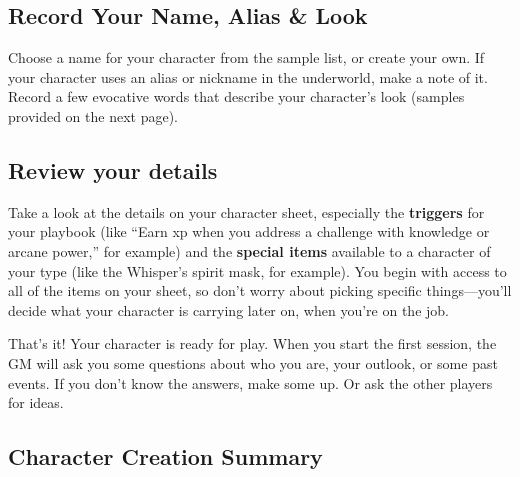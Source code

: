 \subsection{Record Your Name, Alias \& Look}

Choose a name for your character from the sample list, or create your own. If your character uses an alias or nickname in the underworld, make a note of it. Record a few evocative words that describe your character’s look (samples provided on the next page).

\subsection{Review your details}

Take a look at the details on your character sheet, especially the  \textbf{triggers} for your playbook (like ``Earn xp when you address a challenge with knowledge or arcane power,'' for example) and the \textbf{special items} available to a character of your type (like the Whisper’s spirit mask, for example). You begin with access to all of the items on your sheet, so don’t worry about picking specific things---you’ll decide what your character is carrying later on, when you’re on the job.

That’s it! Your character is ready for play. When you start the first session, the GM will ask you some questions about who you are, your outlook, or some past events. If you don’t know the answers, make some up. Or ask the other players for ideas.

\subsection{Character Creation Summary}

